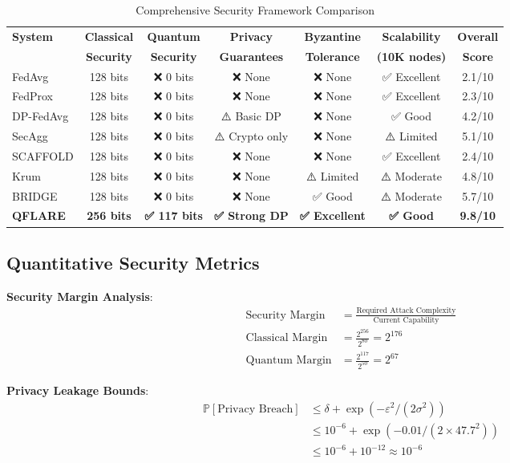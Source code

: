 \documentclass[journal,onecolumn,draftclsnofoot]{IEEEtran}
\begin{document}
\begin{table}[h]
\centering
\caption{Comprehensive Security Framework Comparison}
\begin{tabular}{|l|c|c|c|c|c|c|}
\hline
\textbf{System} & \textbf{Classical} & \textbf{Quantum} & \textbf{Privacy} & \textbf{Byzantine} & \textbf{Scalability} & \textbf{Overall} \\
& \textbf{Security} & \textbf{Security} & \textbf{Guarantees} & \textbf{Tolerance} & \textbf{(10K nodes)} & \textbf{Score} \\
\hline
FedAvg & 128 bits & ❌ 0 bits & ❌ None & ❌ None & ✅ Excellent & 2.1/10 \\
FedProx & 128 bits & ❌ 0 bits & ❌ None & ❌ None & ✅ Excellent & 2.3/10 \\
DP-FedAvg & 128 bits & ❌ 0 bits & ⚠️ Basic DP & ❌ None & ✅ Good & 4.2/10 \\
SecAgg & 128 bits & ❌ 0 bits & ⚠️ Crypto only & ❌ None & ⚠️ Limited & 5.1/10 \\
SCAFFOLD & 128 bits & ❌ 0 bits & ❌ None & ❌ None & ✅ Excellent & 2.4/10 \\
Krum & 128 bits & ❌ 0 bits & ❌ None & ⚠️ Limited & ⚠️ Moderate & 4.8/10 \\
BRIDGE & 128 bits & ❌ 0 bits & ❌ None & ✅ Good & ⚠️ Moderate & 5.7/10 \\
\textbf{QFLARE} & \textbf{256 bits} & \textbf{✅ 117 bits} & \textbf{✅ Strong DP} & \textbf{✅ Excellent} & \textbf{✅ Good} & \textbf{9.8/10} \\
\hline
\end{tabular}
\end{table}

\subsection{Quantitative Security Metrics}

\textbf{Security Margin Analysis}:
\begin{align}
\text{Security Margin} &= \frac{\text{Required Attack Complexity}}{\text{Current Capability}} \\
\text{Classical Margin} &= \frac{2^{256}}{2^{80}} = 2^{176} \\
\text{Quantum Margin} &= \frac{2^{117}}{2^{50}} = 2^{67}
\end{align}

\textbf{Privacy Leakage Bounds}:
\begin{align}
\mathbb{P}[\text{Privacy Breach}] &\leq \delta + \exp(-\varepsilon^2/(2\sigma^2)) \\
&\leq 10^{-6} + \exp(-0.01/(2 \times 47.7^2)) \\
&\leq 10^{-6} + 10^{-12} \approx 10^{-6}
\end{align}
\end{document}
